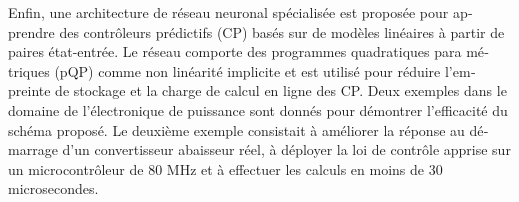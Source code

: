 \begin{otherlanguage}{french}
Enfin, une architecture de réseau neuronal spécialisée est proposée pour apprendre des contrôleurs prédictifs (CP) basés sur de modèles linéaires à partir de paires état-entrée. Le réseau comporte des programmes quadratiques para métriques (pQP) comme non linéarité implicite et est utilisé pour réduire l'empreinte de stockage et la charge de calcul en ligne des CP. Deux exemples dans le domaine de l'électronique de puissance sont donnés pour démontrer l'efficacité du schéma proposé. Le deuxième exemple consistait à améliorer la réponse au démarrage d'un convertisseur abaisseur réel, à déployer la loi de contrôle apprise sur un microcontrôleur de 80 MHz et à effectuer les calculs en moins de 30 microsecondes.

\end{otherlanguage}


